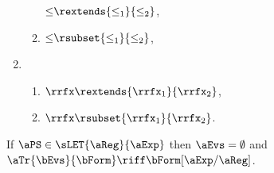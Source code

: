 \begin{figure}
\begin{multicols}{2}
\begin{enumerate}[topsep=0pt,label=(\textsc{i}\arabic*),ref=\textsc{i}\arabic*]
\begin{enumerate}[leftmargin=0pt]
        ${\le}\rextends{\le_1}{\le_2}$,
      \item \label{if-le-subset}
        ${\le}\rsubset{\le_1}{\le_2}$,
      \end{enumerate}
    \item[] 
      \begin{enumerate}[leftmargin=0pt]
      \item \label{if-rf-extends}
        ${\rrfx}\rextends{\rrfx_1}{\rrfx_2}$,
      \item \label{if-rf-le}
        ${\rrfx}\rsubset{\rrfx_1}{\rrfx_2}$.
      \end{enumerate}
    \end{enumerate}
  \end{multicols}
  \medskip

  \noindent
  If $\aPS\in\sLET{\aReg}{\aExp}$ then $\aEvs = \emptyset$ and
  $\aTr{\bEvs}{\bForm} \riff \bForm[\aExp/\aReg]$.
  \medskip


\end{figure}
